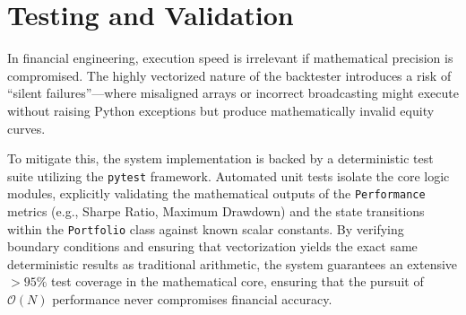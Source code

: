\section{Testing and Validation}

In financial engineering, execution speed is irrelevant if mathematical precision is compromised. The highly vectorized nature of the backtester introduces a risk of ``silent failures''---where misaligned arrays or incorrect broadcasting might execute without raising Python exceptions but produce mathematically invalid equity curves.

To mitigate this, the system implementation is backed by a deterministic test suite utilizing the \texttt{pytest} framework. Automated unit tests isolate the core logic modules, explicitly validating the mathematical outputs of the \texttt{Performance} metrics (e.g., Sharpe Ratio, Maximum Drawdown) and the state transitions within the \texttt{Portfolio} class against known scalar constants. By verifying boundary conditions and ensuring that vectorization yields the exact same deterministic results as traditional arithmetic, the system guarantees an extensive $>95\%$ test coverage in the mathematical core, ensuring that the pursuit of \(\mathcal{O}(N)\) performance never compromises financial accuracy.

